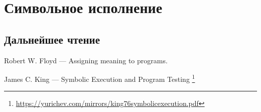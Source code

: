 \section{Символьное исполнение}




\subsection{Дальнейшее чтение}

Robert W. Floyd --- Assigning meaning to programs.

James C. King --- Symbolic Execution and Program Testing
\footnote{\url{https://yurichev.com/mirrors/king76symbolicexecution.pdf}}

